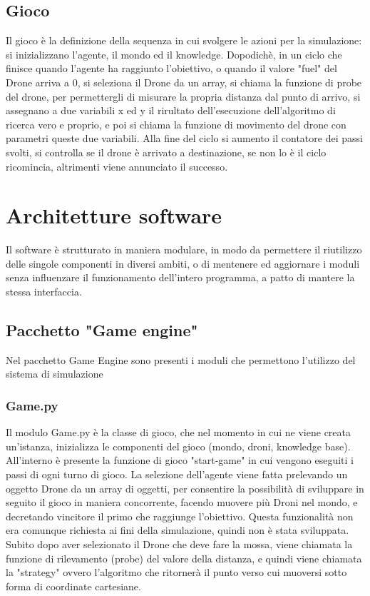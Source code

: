 \subsection{Gioco}
Il gioco è la definizione della sequenza in cui svolgere le azioni per la simulazione: si inizializzano l'agente, il mondo ed il knowledge. Dopodichè, in un ciclo che finisce quando l'agente ha raggiunto l'obiettivo, o quando il valore "fuel" del Drone arriva a 0, si seleziona il Drone da un array, si chiama la funzione di probe del drone, per permettergli di misurare la propria distanza dal punto di arrivo, si assegnano a due variabili x ed y il rirultato dell'esecuzione dell'algoritmo di ricerca vero e proprio, e poi si chiama la funzione di movimento del drone con parametri queste due variabili. Alla fine del ciclo si aumento il contatore dei passi svolti, si controlla se il drone è arrivato a destinazione, se non lo è il ciclo ricomincia, altrimenti viene annunciato il successo.

	
\section{Architetture software}
Il software è strutturato in maniera modulare, in modo da permettere il riutilizzo delle singole componenti in diversi ambiti, o di mentenere ed aggiornare i moduli senza influenzare il funzionamento dell'intero programma, a patto di mantere la stessa interfaccia.
\subsection{Pacchetto "Game engine"}
Nel pacchetto Game Engine sono presenti i moduli che permettono l'utilizzo del sistema di simulazione
\subsubsection{Game.py}
Il modulo Game.py è la classe di gioco, che nel momento in cui ne viene creata un'istanza, inizializza le componenti del gioco (mondo, droni, knowledge base). All'interno è presente la funzione di gioco "start-game" in cui vengono eseguiti i passi di ogni turno di gioco. La selezione dell'agente viene fatta prelevando un oggetto Drone da un array di oggetti, per consentire la possibilità di sviluppare in seguito il gioco in maniera concorrente, facendo muovere più Droni nel mondo, e decretando vincitore il primo che raggiunge l'obiettivo. Questa funzionalità non era comunque richiesta ai fini della simulazione, quindi non è stata sviluppata. Subito dopo aver selezionato il Drone che deve fare la mossa, viene chiamata la funzione di rilevamento (probe) del valore della distanza, e quindi viene chiamata la "strategy" ovvero l'algoritmo che ritornerà il punto verso cui muoversi sotto forma di coordinate cartesiane.
